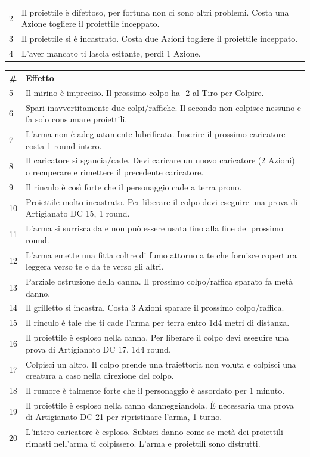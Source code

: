 \begin{multicols}{2}
\begin{tabularx}{0.48\textwidth}{lX}
2 & Il proiettile è difettoso, per fortuna non ci sono altri problemi. Costa una Azione togliere il proiettile inceppato.\\
3 & Il proiettile si è incastrato. Costa due Azioni togliere il proiettile inceppato.\\
4 & L'aver mancato ti lascia esitante, perdi 1 Azione.\\
\end{tabularx}
\noindent\begin{tabularx}{0.48\textwidth}{lX}
\toprule
\textbf{\#}& \textbf{Effetto}\\
5 & Il mirino è impreciso. Il prossimo colpo ha -2 al Tiro per Colpire.\\
6 & Spari inavvertitamente due colpi/raffiche. Il secondo non colpisce nessuno e fa solo consumare proiettili.\\
7 & L'arma non è adeguatamente lubrificata. Inserire il prossimo caricatore costa 1 round intero.\\
8 & Il caricatore si sgancia/cade. Devi caricare un nuovo caricatore (2 Azioni) o recuperare e rimettere il precedente caricatore.\\
9 & Il rinculo è così forte che il personaggio cade a terra prono.\\
10 & Proiettile molto incastrato. Per liberare il colpo devi eseguire una prova di Artigianato DC 15, 1 round.\\
11 & L'arma si surriscalda e non può essere usata fino alla fine del prossimo round.\\
12 & L'arma emette una fitta coltre di fumo attorno a te che fornisce copertura leggera verso te e da te verso gli altri.\\
13 & Parziale ostruzione della canna. Il prossimo colpo/raffica sparato fa metà danno.\\
14 & Il grilletto si incastra. Costa 3 Azioni sparare il prossimo colpo/raffica.\\
15 & Il rinculo è tale che ti cade l'arma per terra entro 1d4 metri di distanza.\\
16 & Il proiettile è esploso nella canna. Per liberare il colpo devi eseguire una prova di Artigianato DC 17, 1d4 round.\\
17 & Colpisci un altro. Il colpo prende una traiettoria non voluta e colpisci una creatura a caso nella direzione del colpo.\\
18 & Il rumore è talmente forte che il personaggio è assordato per 1 minuto.\\
19 & Il proiettile è esploso nella canna danneggiandola. È necessaria una prova di Artigianato DC 21 per ripristinare l'arma, 1 turno.\\
20 & L'intero caricatore è esploso. Subisci danno come se metà dei proiettili rimasti nell'arma ti colpissero. L'arma e proiettili sono distrutti.
\end{tabularx}


\end{multicols}
